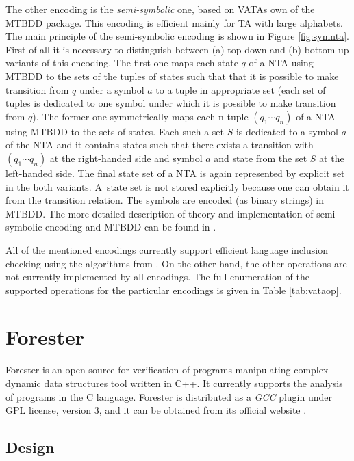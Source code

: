 The other encoding is the \emph{semi-symbolic} one,
based on VATAs own of the MTBDD package.
This encoding is efficient mainly for TA with large alphabets.
The main principle of the semi-symbolic encoding is shown in Figure \ref{fig:symnta}.
First of all it is necessary to distinguish between (a) top-down and (b) bottom-up variants of this encoding.
The first one maps each state $q$ of a NTA using MTBDD to the sets of the tuples of states such that that it is possible
to make transition from $q$ under a symbol $a$ to a tuple in appropriate set (each set of tuples is dedicated
to one symbol under which it is possible to make transition from $q$).
The former one symmetrically maps each n-tuple $(q_1 \cdots q_n)$ of a NTA using MTBDD to the sets of states.
Each such a set $S$ is dedicated to a symbol $a$ of the NTA and
it contains states such that there exists a transition
with $(q_1 \cdots q_n)$ at the right-handed side and symbol $a$ and state from the set $S$ at the left-handed side.
The final state set of a NTA is again represented by explicit set in the both variants.
A~state set is not stored explicitly because one can obtain it from the transition relation.
The symbols are encoded (as binary strings) in MTBDD.
The more detailed description of theory and implementation
of semi-symbolic encoding and MTBDD can be found in \cite{mt:lengal}.

All of the mentioned encodings currently support efficient language inclusion checking using the algorithms
from \cite{tacas10}.
On the other hand, the other operations are not currently implemented by all encodings.
The full enumeration of the supported operations for the particular encodings is given in Table \ref{tab:vataop}.



\section{Forester}
\label{sec:FA}

Forester is an open source for verification of programs manipulating
complex dynamic data structures tool written in C++.
It currently supports the analysis of programs in the C language.
Forester is distributed as a \emph{GCC} plugin under GPL license, version 3,
and it can be obtained from its official website \cite{www:forester}.

\subsection{Design}

